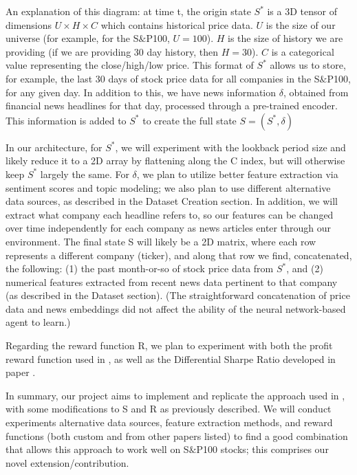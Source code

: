 An explanation of this diagram: at time t, the origin state $S^*$ is a 3D tensor of dimensions $U \times H \times C$
which contains historical price data. $U$ is the size of our universe (for example, for the S$\&$P100, $U = 100$). 
$H$ is the size of history we are providing (if we are providing 30 day history, then $H = 30$). 
$C$ is a categorical value representing the close/high/low price. This format of $S^*$ allows us to store, 
for example, the last 30 days of stock price data for all companies in the S$\&$P100, for any given day. 
In addition to this, we have news information $\delta$, obtained from financial news headlines for that day, 
processed through a pre-trained encoder. This information is added to $S^*$ to create the full state 
$S = (S^*, \delta)$

In our architecture, for $S^*$, we will experiment with the lookback period size and likely reduce it 
to a 2D array by flattening along the C index, but will otherwise keep $S^*$ largely the same. For 
$\delta$, we plan to utilize better feature extraction via sentiment scores and topic modeling; 
we also plan to use different alternative data sources, as described in the Dataset Creation section. 
In addition, we will extract what company each headline refers to, so our features can be changed 
over time independently for each company as news articles enter through our environment. The final 
state S will likely be a 2D matrix, where each row represents a different company (ticker), and along 
that row we find, concatenated, the following: (1) the past month-or-so of stock price data from $S^*$, 
and (2) numerical features extracted from recent news data pertinent to that company (as described 
in the Dataset section). (The straightforward concatenation of price data and news embeddings did not 
affect the ability of the neural network-based agent to learn.)

Regarding the reward function R, we plan to experiment with both the profit reward function used in \cite{rl_augmented_states}, 
as well as the Differential Sharpe Ratio developed in paper \cite{drl_mvo}.

In summary, our project aims to implement and replicate the approach used in \cite{rl_augmented_states}, with 
some modifications to S and R as previously described. We will conduct experiments alternative data 
sources, feature extraction methods, and reward functions (both custom and from other papers listed) 
to find a good combination that allows this approach to work well on S$\&$P100 stocks; this comprises our 
novel extension/contribution.

